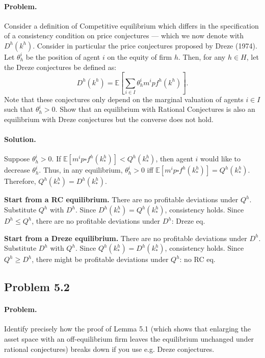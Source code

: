 \paragraph{Problem.} Consider a definition of Competitive equilibrium which differs in the specification of a consistency condition on price conjectures --- which we now denote with $D^h(k^h)$. Consider in particular the price conjectures proposed by Dreze (1974). Let $\theta_h^i$ be the position of agent $i$ on the equity of firm $h$. Then, for any $h \in H$, let the Dreze conjectures be defined as:
\[
D^h(k^h) = \mathbb{E}\left[ \sum_{i \in I} \theta_h^i m^i p f^h(k^h) \right].
\]
Note that these conjectures only depend on the marginal valuation of agents $i \in I$ such that $\theta_h^i > 0$. Show that an equilibrium with Rational Conjectures is also an equilibrium with Dreze conjectures but the converse does not hold.

\paragraph{Solution.}
Suppose $\theta_h^i > 0$. If $\mathbb{E}[m^i p \square f^h(k_*^h)] < Q^h(k_*^h)$, then agent $i$ would like to decrease $\theta_h^i$. Thus, in any equilibrium, $\theta_h^i > 0$ iff $\mathbb{E}[m^i p \square f^h(k_*^h)] = Q^h(k_*^h)$. Therefore, $Q^h(k_*^h) = D^h(k_*^h)$.

\textbf{Start from a RC equilibrium.} There are no profitable deviations under $Q^h$. Substitute $Q^h$ with $D^h$. Since $D^h(k_*^h) = Q^h(k_*^h)$, consistency holds. Since $D^h \leq Q^h$, there are no profitable deviations under $D^h$: Dreze eq.

\textbf{Start from a Dreze equilibrium.} There are no profitable deviations under $D^h$. Substitute $D^h$ with $Q^h$. Since $Q^h(k_*^h) = D^h(k_*^h)$, consistency holds. Since $Q^h \geq D^h$, there might be profitable deviations under $Q^h$: no RC eq.

\subsection{Problem 5.2}
\paragraph{Problem.} Identify precisely how the proof of Lemma 5.1 (which shows that enlarging the asset space with an off-equilibrium firm leaves the equilibrium unchanged under rational conjectures) breaks down if you use e.g. Dreze conjectures.

